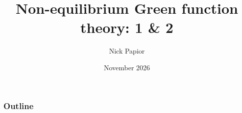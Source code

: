 

\graphicspath{{fig/}{../fig/}}
\usepackage[export]{adjustbox}


\date{November 2026}
\title{Non-equilibrium Green function theory: 1 \& 2}
\author{Nick Papior}

\begin{frame}
  \titlepage
\end{frame}

\begin{frame}
  \frametitle{Outline}
  \tableofcontents
\end{frame}



